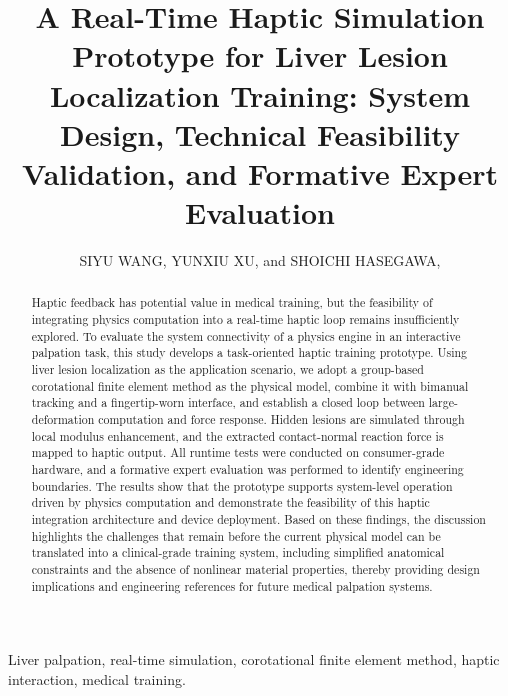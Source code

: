 \documentclass{ieeeaccess}
\begin{document}

\title{A Real-Time Haptic Simulation Prototype for Liver Lesion Localization Training: System Design, Technical Feasibility Validation, and Formative Expert Evaluation}
\author{\uppercase{Siyu Wang},
\uppercase{Yunxiu Xu},
and \uppercase{Shoichi Hasegawa}, }
\address[1]{Department of Information and Communication Engineering, Institute of Science Tokyo, Yokohama, Japan (e-mail: siw131@haselab.net, yunxiu@haselab.net, hasevr@haselab.net)}

\begin{abstract}
Haptic feedback has potential value in medical training, but the feasibility of integrating physics computation into a real-time haptic loop remains insufficiently explored. To evaluate the system connectivity of a physics engine in an interactive palpation task, this study develops a task-oriented haptic training prototype. Using liver lesion localization as the application scenario, we adopt a group-based corotational finite element method as the physical model, combine it with bimanual tracking and a fingertip-worn interface, and establish a closed loop between large-deformation computation and force response. Hidden lesions are simulated through local modulus enhancement, and the extracted contact-normal reaction force is mapped to haptic output. All runtime tests were conducted on consumer-grade hardware, and a formative expert evaluation was performed to identify engineering boundaries. The results show that the prototype supports system-level operation driven by physics computation and demonstrate the feasibility of this haptic integration architecture and device deployment. Based on these findings, the discussion highlights the challenges that remain before the current physical model can be translated into a clinical-grade training system, including simplified anatomical constraints and the absence of nonlinear material properties, thereby providing design implications and engineering references for future medical palpation systems.
\end{abstract}

\begin{keywords}
Liver palpation, real-time simulation, corotational finite element method, haptic interaction, medical training.
\end{keywords}
\end{document}
